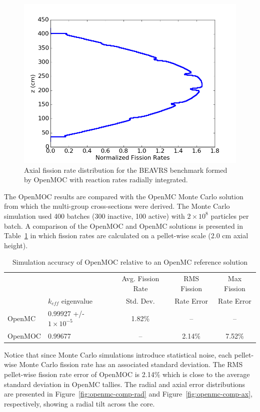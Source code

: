 \begin{figure}[ht!]
	\centering
	\includegraphics[width=0.8\linewidth]{figures/results/rr-plots/beavrs-3d-axial.png}
	\caption{Axial fission rate distribution for the BEAVRS benchmark formed by OpenMOC with reaction rates radially integrated.}
	\label{fig:full-core-axial}
\end{figure}

\newpage
The OpenMOC results are compared with the OpenMC Monte Carlo solution from which the multi-group cross-sections were derived. The Monte Carlo simulation used 400 batches (300 inactive, 100 active) with $2 \times 10^8$ particles per batch. A comparison of the OpenMOC and OpenMC solutions is presented in Table~\ref{tab:openmc-comparison} in which fission rates are calculated on a pellet-wise scale (2.0 cm axial height).

\begin{table}[ht]
	\centering
	\caption{Simulation accuracy of OpenMOC relative to an OpenMC reference solution}
	\medskip
	\begin{tabular}{l|l|c|c|c}
		&                               & Avg. Fission Rate & \ac{RMS} Fission & Max Fission \\
		& $k_{\textit{eff}}$ eigenvalue & Std. Dev.         & Rate Error & Rate Error \\
		\hline
		OpenMC  & 0.99927 +/- $1 \times 10^{-5}$  & 1.82\% & --     & -- \\
		OpenMOC & 0.99677                         & --     & 2.14\% & 7.52\% \\
		\hline
	\end{tabular}
	\label{tab:openmc-comparison}
\end{table}

Notice that since Monte Carlo simulations introduce statistical noise, each pellet-wise Monte Carlo fission rate has an associated standard deviation. The \ac{RMS} pellet-wise fission rate error of OpenMOC is 2.14\% which is close to the average standard deviation in OpenMC tallies. The radial and axial error distributions are presented in Figure~\ref{fig:openmc-comp-rad} and Figure~\ref{fig:openmc-comp-ax}, respectively, showing a radial tilt across the core.

